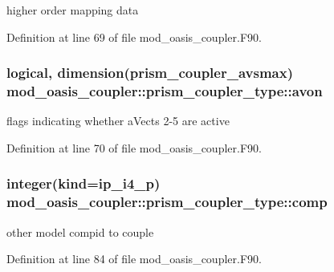 higher order mapping data 



Definition at line 69 of file mod\+\_\+oasis\+\_\+coupler.\+F90.

\hypertarget{structmod__oasis__coupler_1_1prism__coupler__type_aa2090cc6941c0dbbbf4bdb5c68cff873}{
\subsubsection[{avon}]{\setlength{\rightskip}{0pt plus 5cm}logical, dimension({\bf prism\+\_\+coupler\+\_\+avsmax}) mod\+\_\+oasis\+\_\+coupler\+::prism\+\_\+coupler\+\_\+type\+::avon\hspace{0.3cm}{\ttfamily [private]}}}\label{structmod__oasis__coupler_1_1prism__coupler__type_aa2090cc6941c0dbbbf4bdb5c68cff873}


flags indicating whether a\+Vects 2-\/5 are active 



Definition at line 70 of file mod\+\_\+oasis\+\_\+coupler.\+F90.

\hypertarget{structmod__oasis__coupler_1_1prism__coupler__type_a77cc2858814776053af5f3958d29fee2}{
\subsubsection[{comp}]{\setlength{\rightskip}{0pt plus 5cm}integer(kind=ip\+\_\+i4\+\_\+p) mod\+\_\+oasis\+\_\+coupler\+::prism\+\_\+coupler\+\_\+type\+::comp\hspace{0.3cm}{\ttfamily [private]}}}\label{structmod__oasis__coupler_1_1prism__coupler__type_a77cc2858814776053af5f3958d29fee2}


other model compid to couple 



Definition at line 84 of file mod\+\_\+oasis\+\_\+coupler.\+F90.

